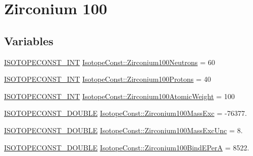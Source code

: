 \hypertarget{group___isotope_const-_zirconium-_zr100}{}\section{Zirconium 100}
\label{group___isotope_const-_zirconium-_zr100}
\subsection*{Variables}
\begin{DoxyCompactItemize}
\item 
\mbox{\hyperlink{group___isotope_const-_macros_ga5f18360b3e99483a35c32d789e62621c}{I\+S\+O\+T\+O\+P\+E\+C\+O\+N\+S\+T\+\_\+\+I\+NT}} \mbox{\hyperlink{group___isotope_const-_zirconium-_zr100_gae9f557aad2a2561517acd240db85a0dd}{Isotope\+Const\+::\+Zirconium100\+Neutrons}} = 60
\item 
\mbox{\hyperlink{group___isotope_const-_macros_ga5f18360b3e99483a35c32d789e62621c}{I\+S\+O\+T\+O\+P\+E\+C\+O\+N\+S\+T\+\_\+\+I\+NT}} \mbox{\hyperlink{group___isotope_const-_zirconium-_zr100_ga0726422a8dac90f1f7926c99523cae34}{Isotope\+Const\+::\+Zirconium100\+Protons}} = 40
\item 
\mbox{\hyperlink{group___isotope_const-_macros_ga5f18360b3e99483a35c32d789e62621c}{I\+S\+O\+T\+O\+P\+E\+C\+O\+N\+S\+T\+\_\+\+I\+NT}} \mbox{\hyperlink{group___isotope_const-_zirconium-_zr100_ga6aa0f4b54be0607f5b46263c5e47464b}{Isotope\+Const\+::\+Zirconium100\+Atomic\+Weight}} = 100
\item 
\mbox{\hyperlink{group___isotope_const-_macros_ga8f45a7272ce02c0b4c65c44636ed719a}{I\+S\+O\+T\+O\+P\+E\+C\+O\+N\+S\+T\+\_\+\+D\+O\+U\+B\+LE}} \mbox{\hyperlink{group___isotope_const-_zirconium-_zr100_ga8bda9246be44e6ee95a487bf16aa4d64}{Isotope\+Const\+::\+Zirconium100\+Mass\+Exc}} = -\/76377.
\item 
\mbox{\hyperlink{group___isotope_const-_macros_ga8f45a7272ce02c0b4c65c44636ed719a}{I\+S\+O\+T\+O\+P\+E\+C\+O\+N\+S\+T\+\_\+\+D\+O\+U\+B\+LE}} \mbox{\hyperlink{group___isotope_const-_zirconium-_zr100_ga8d27b58fc10766de79b3062fc5a09371}{Isotope\+Const\+::\+Zirconium100\+Mass\+Exc\+Unc}} = 8.
\item 
\mbox{\hyperlink{group___isotope_const-_macros_ga8f45a7272ce02c0b4c65c44636ed719a}{I\+S\+O\+T\+O\+P\+E\+C\+O\+N\+S\+T\+\_\+\+D\+O\+U\+B\+LE}} \mbox{\hyperlink{group___isotope_const-_zirconium-_zr100_ga5afa768f3f16d8b3ca6c20490ee4ab28}{Isotope\+Const\+::\+Zirconium100\+Bind\+E\+PerA}} = 8522.
\item 

\end{DoxyCompactItemize}
